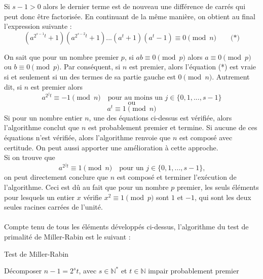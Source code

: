		Si $s - 1 > 0$ alors le dernier terme est de nouveau une différence de carrés qui peut donc être factorisée. En continuant de la même manière, on obtient au final l'expression suivante :
		\[ (a^{2^{s-1}t} + 1)(a^{2^{s-2}t} + 1)...(a^{t} + 1)(a^{t} - 1) \equiv 0 \pmod n \quad\quad \text{(*)}\]
		
		On sait que pour un nombre premier $p$, si $ab \equiv 0 \pmod p$ alors $a \equiv 0 \pmod p$ ou $b \equiv 0 \pmod p$. Par conséquent, si $n$ est premier, alors l'équation (*) est vraie si et seulement si un des termes de sa partie gauche est $0 \pmod n$. Autrement dit, si $n$ est premier alors
		\[ a^{2^{j}t} \equiv -1 \pmod n \quad \text{pour au moins un } j \in \{0, 1, ..., s-1\} \]
		\[\text{ou}\]
		\[ a^{t} \equiv 1 \pmod n\]
		\indent Si pour un nombre entier $n$, une des équations ci-dessus est vérifiée, alors l'algorithme conclut que $n$ est probablement premier et termine. Si aucune de ces équations n'est vérifiée, alors l'algorithme renvoie que $n$ est composé avec certitude. On peut aussi apporter une amélioration à cette approche.\\
		\indent Si on trouve que
		\[ a^{2^{j}t} \equiv 1 \pmod n \quad \text{pour un } j \in \{0, 1, ..., s-1\} \text{,}\]
		on peut directement conclure que $n$ est composé et terminer l'exécution de l'algorithme. Ceci est dû au fait que pour un nombre $p$ premier, les seuls éléments pour lesquels un entier $x$ vérifie $x^{2} \equiv 1 \pmod p$ sont $1$ et $-1$, qui sont les deux seules racines carrées de l'unité.
		
		\paragraph{} Compte tenu de tous les éléments développés ci-dessus, l'algorithme du test de primalité de Miller-Rabin est le suivant :\\
		
		\begin{algorithm}[H]
			\caption{Test de Miller-Rabin}\label{TMR}
			{Décomposer $n - 1 = 2^{s}t$, avec $s \in \mathbb{N}^{*}$ et $t \in \mathbb{N}$ impair \;}
			\Retour probablement premier\;
		\end{algorithm}
	

